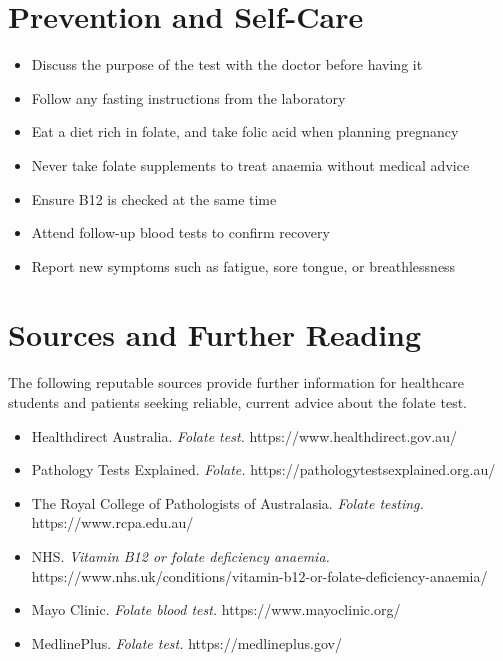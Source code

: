 \section*{Prevention and Self-Care}
\begin{itemize}
    \item Discuss the purpose of the test with the doctor before having it
    \item Follow any fasting instructions from the laboratory
    \item Eat a diet rich in folate, and take folic acid when planning pregnancy
    \item Never take folate supplements to treat anaemia without medical advice
    \item Ensure B12 is checked at the same time
    \item Attend follow-up blood tests to confirm recovery
    \item Report new symptoms such as fatigue, sore tongue, or breathlessness
\end{itemize}

\section*{Sources and Further Reading}
The following reputable sources provide further information for healthcare students and patients seeking reliable, current advice about the folate test.
\begin{itemize}
    \item Healthdirect Australia. \textit{Folate test.} https://www.healthdirect.gov.au/
    \item Pathology Tests Explained. \textit{Folate.} https://pathologytestsexplained.org.au/
    \item The Royal College of Pathologists of Australasia. \textit{Folate testing.} https://www.rcpa.edu.au/
    \item NHS. \textit{Vitamin B12 or folate deficiency anaemia.} https://www.nhs.uk/conditions/vitamin-b12-or-folate-deficiency-anaemia/
    \item Mayo Clinic. \textit{Folate blood test.} https://www.mayoclinic.org/
    \item MedlinePlus. \textit{Folate test.} https://medlineplus.gov/
\end{itemize}
